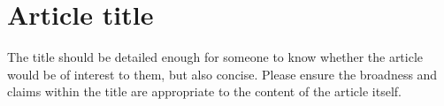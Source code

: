 \section*{Article title}
The title should be detailed enough for someone to know whether the article would be of interest to them, but also concise. Please ensure the broadness and claims within the title are appropriate to the content of the article itself.
